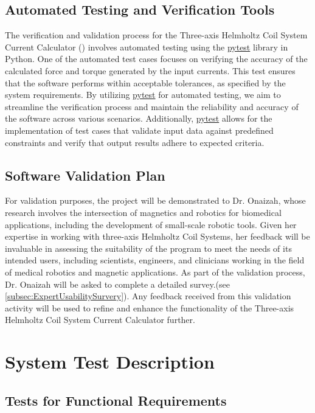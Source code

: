 \documentclass[12pt, titlepage]{article}
\begin{document}
\subsection{Automated Testing and Verification Tools}
The verification and validation process for the Three-axis Helmholtz Coil System Current Calculator (\progname{}) involves automated testing using the \href{https://docs.pytest.org/en/8.0.x/}{pytest} library in Python. One of the automated test cases focuses on verifying the accuracy of the calculated force and torque generated by the input currents. This test ensures that the software performs within acceptable tolerances, as specified by the system requirements. By utilizing \href{https://docs.pytest.org/en/8.0.x/}{pytest} for automated testing, we aim to streamline the verification process and maintain the reliability and accuracy of the software across various scenarios. Additionally, \href{https://docs.pytest.org/en/8.0.x/}{pytest} allows for the implementation of test cases that validate input data against predefined constraints and verify that output results adhere to expected criteria.



\subsection{Software Validation Plan}\label{sec:SysTestDisc}

For validation purposes, the project will be demonstrated to Dr. Onaizah, whose research involves the intersection of magnetics and robotics for biomedical applications, including the development of small-scale robotic tools. Given her expertise in working with three-axis Helmholtz Coil Systems, her feedback will be invaluable in assessing the suitability of the program to meet the needs of its intended users, including scientists, engineers, and clinicians working in the field of medical robotics and magnetic applications. As part of the validation process, Dr. Onaizah will be asked to complete a detailed survey.(see \ref{subsec:ExpertUsabilitySurvery}). Any feedback received from this validation activity will be used to refine and enhance the functionality of the Three-axis Helmholtz Coil System Current Calculator further.

\section{System Test Description}
	
\subsection{Tests for Functional Requirements}
\end{document}
